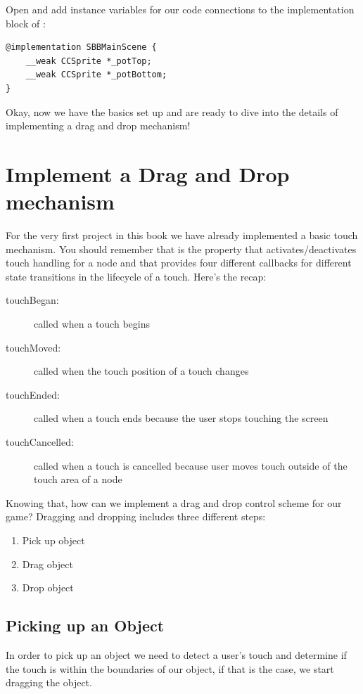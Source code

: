 \begin{leftbar}
Open  and add instance variables for our code
connections to the implementation block of :
\begin{lstlisting}
@implementation SBBMainScene {
    __weak CCSprite *_potTop;
    __weak CCSprite *_potBottom;
}
\end{lstlisting}
\end{leftbar}

Okay, now we have the basics set up and are ready to dive into the details of
implementing a drag and drop mechanism!

\section{Implement a Drag and Drop mechanism}
For the very first project in this book we have already implemented a basic
touch mechanism. You should remember that  is
the property that activates/deactivates touch handling for a node and that
\cocos{} provides four different callbacks for different state transitions in
the lifecycle of a touch. Here's the recap:

\begin{description}
\item[touchBegan:] called when a touch begins
\item[touchMoved:] called when the touch position of a touch changes
\item[touchEnded:] called when a touch ends because the user stops touching the
screen
\item[touchCancelled:] called when a touch is cancelled because user moves touch
outside of the touch area of a node
\end{description}

Knowing that, how can we implement a drag and drop control scheme for our game?
Dragging and dropping includes three different steps:
\begin{enumerate}
  \item Pick up object
  \item Drag object
  \item Drop object
\end{enumerate}

\subsection{Picking up an Object}
In order to pick up an object we need to detect a user's touch and determine if
the touch is within the boundaries of our object, if that is the case,
we start dragging the object.

